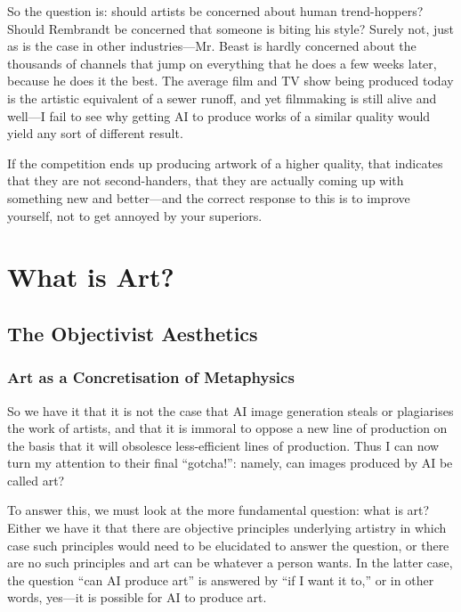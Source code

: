 \documentclass[11pt]{article}
\begin{document}
So the question is: should artists be concerned about human trend-hoppers? Should Rembrandt be concerned that someone is biting his style? Surely not, just as is the case in other industries---Mr. Beast is hardly concerned about the thousands of channels that jump on everything that he does a few weeks later, because he does it the best. The average film and TV show being produced today is the artistic equivalent of a sewer runoff, and yet filmmaking is still alive and well---I fail to see why getting AI to produce works of a similar quality would yield any sort of different result.

If the competition ends up producing artwork of a higher quality, that indicates that they are not second-handers, that they are actually coming up with something new and better---and the correct response to this is to improve yourself, not to get annoyed by your superiors.

\section*{What is Art?}
\label{sec:orgb9ef0b0}
\subsection*{The Objectivist Aesthetics}
\label{sec:orgd4cdf43}
\subsubsection*{Art as a Concretisation of Metaphysics}
\label{sec:org61ad394}
So we have it that it is not the case that AI image generation steals or plagiarises the work of artists, and that it is immoral to oppose a new line of production on the basis that it will obsolesce less-efficient lines of production. Thus I can now turn my attention to their final ``gotcha!'': namely, can images produced by AI be called art?

To answer this, we must look at the more fundamental question: what is art? Either we have it that there are objective principles underlying artistry in which case such principles would need to be elucidated to answer the question, or there are no such principles and art can be whatever a person wants. In the latter case, the question ``can AI produce art'' is answered by ``if I want it to,'' or in other words, yes---it is possible for AI to produce art.
\end{document}
